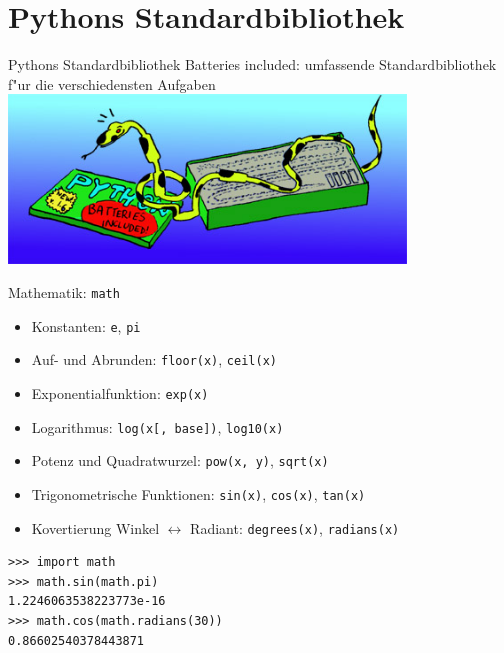 \section{Pythons Standardbibliothek}

\begin{frame}{Pythons Standardbibliothek}
\alert{\glqq Batteries included\grqq}: umfassende Standardbibliothek f"ur die verschiedensten Aufgaben\\[4mm]

\includegraphics[height=4.5cm]{images/batteries_included.jpg}
\end{frame}

\begin{frame}[fragile]{Mathematik: \texttt{math}}
\begin{itemize}
\item Konstanten: \texttt{e}, \texttt{pi}
\item Auf- und Abrunden: \texttt{floor(x)}, \texttt{ceil(x)}
\item Exponentialfunktion: \texttt{exp(x)}
\item Logarithmus: \texttt{log(x[, base])}, \texttt{log10(x)}
\item Potenz und Quadratwurzel: \texttt{pow(x, y)}, \texttt{sqrt(x)}
\item Trigonometrische Funktionen: \texttt{sin(x)}, \texttt{cos(x)}, \texttt{tan(x)}
\item Kovertierung Winkel $\leftrightarrow$ Radiant: \texttt{degrees(x)}, \texttt{radians(x)}
\end{itemize}
\begin{lstlisting}[style=Shell]
>>> import math
>>> math.sin(math.pi)
1.2246063538223773e-16
>>> math.cos(math.radians(30))
0.86602540378443871
\end{lstlisting}
\end{frame}


